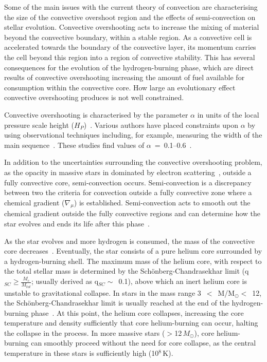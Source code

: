 Some of the main issues with the current theory of convection are characterising the size of the convective overshoot region and the effects of semi-convection on stellar evolution.
Convective overshooting acts to increase the mixing of material beyond the convective boundary, within a stable region.
As a convective cell is accelerated towards the boundary of the convective layer, its momentum carries the cell beyond this region into a region of convective stability.
This has several consequences for the evolution of the hydrogen-burning phase, which are direct results of convective overshooting increasing the amount of fuel available for consumption within the convective core.
How large an evolutionary effect convective overshooting produces is not well constrained.

Convective overshooting is characterised by the parameter $\alpha$ in units of the local pressure scale height ($H_{P}$)~\citep{2012sse..book.....K}.
Various authors have placed constraints upon $\alpha$ by using observational techniques including, for example, measuring the width of the main sequence~\citep{Schroder97,Brott11}.
These studies find values of $\alpha$~=~0.1--0.6~\citep[e.e.][who found $\alpha = 0.335$]{Brott11}.

In addition to the uncertainties surrounding the convective overshooting problem, as the opacity in massive stars in dominated by electron scattering~\citep{b:Bohm-vitense92.v3}, outside a fully convective core, semi-convection occurs.
Semi-convection is a discrepancy between two the criteria for convection outside a fully convective zone where a chemical gradient ($\nabla _{\mu}$) is established.
Semi-convection acts to smooth out the chemical gradient outside the fully convective regions and can determine how the star evolves and ends its life after this phase~\citep[e.g.][]{1989A&A...224L..17L}.

As the star evolves and more hydrogen is consumed, the mass of the convective core decreases~\citep{2012sse..book.....K}.
Eventually, the star consists of a pure helium core surrounded by a hydrogen-burning shell.
The maximum mass of the helium core, with respect to the total stellar mass is determined by the Sch\"onberg-Chandrasekhar limit
(q$_{SC}\geq\frac{M_{c}}{M_{tot}}$; usually derived as q$_{SC}\sim$~0.1), above which an inert helium core is unstable to gravitational collapse.
In stars in the mass range 3~$<$~M/M$_{\odot}<$~12, the Sch\"onberg-Chandrasekhar limit is usually reached at the end of the hydrogen-burning phase~\citep{b:SalarisCassisi05}.
At this point, the helium core collapses, increasing the core temperature and density sufficiently that core helium-burning can occur, halting the collapse in the process.
In more massive stars ($>$12\,$M_{\odot}$), core helium-burning can smoothly proceed without the need for core collapse, as the central temperature in these stars is sufficiently high (10$^{8}$\,K).

